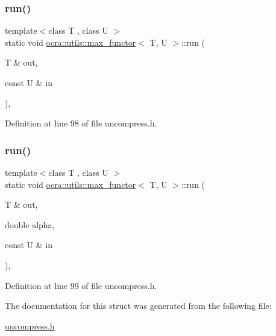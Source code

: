 \subsubsection{\texorpdfstring{run()}{run()}\hspace{0.1cm}{\footnotesize\ttfamily [1/2]}}
{\footnotesize\ttfamily template$<$class T , class U $>$ \\
static void \hyperlink{structocra_1_1utils_1_1max__functor}{ocra\+::utils\+::max\+\_\+functor}$<$ T, U $>$\+::run (\begin{DoxyParamCaption}\item[{T \&}]{out,  }\item[{const U \&}]{in }\end{DoxyParamCaption})\hspace{0.3cm}{\ttfamily [inline]}, {\ttfamily [static]}}



Definition at line 98 of file uncompress.\+h.

\hypertarget{structocra_1_1utils_1_1max__functor_ac1069592ea09b6f4eafd87704d018afa}{}\label{structocra_1_1utils_1_1max__functor_ac1069592ea09b6f4eafd87704d018afa} 
\subsubsection{\texorpdfstring{run()}{run()}\hspace{0.1cm}{\footnotesize\ttfamily [2/2]}}
{\footnotesize\ttfamily template$<$class T , class U $>$ \\
static void \hyperlink{structocra_1_1utils_1_1max__functor}{ocra\+::utils\+::max\+\_\+functor}$<$ T, U $>$\+::run (\begin{DoxyParamCaption}\item[{T \&}]{out,  }\item[{double}]{alpha,  }\item[{const U \&}]{in }\end{DoxyParamCaption})\hspace{0.3cm}{\ttfamily [inline]}, {\ttfamily [static]}}



Definition at line 99 of file uncompress.\+h.



The documentation for this struct was generated from the following file\+:\begin{DoxyCompactItemize}
\item 
\hyperlink{uncompress_8h}{uncompress.\+h}\end{DoxyCompactItemize}
